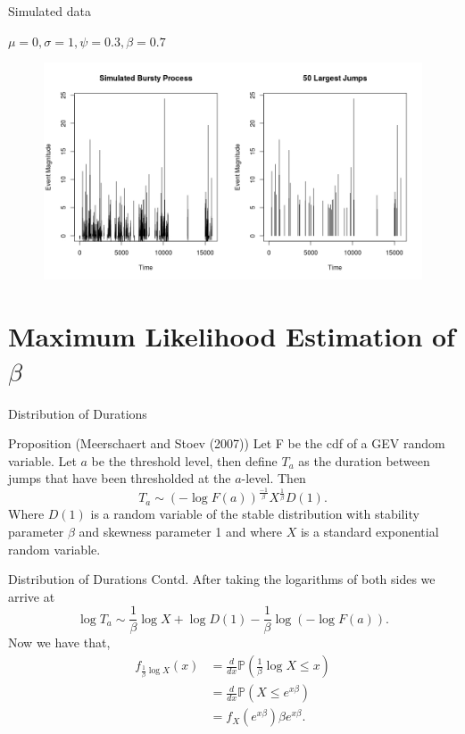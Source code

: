 \documentclass{beamer}
\newcommand{\Prob}{\mathbb{P}}
\begin{document}
\begin{frame}{Simulated data}
    \begin{center}
        $\mu=0, \sigma=1, \psi=0.3,\beta=0.7$
    \end{center}
	\begin{figure}
        \centering
        \vspace{-0.5cm}
        \hspace{-0.8cm}
        \includegraphics[scale=0.45]{SimulatedBursty.jpeg}
    \end{figure}
\end{frame}
\section{Maximum Likelihood Estimation of $\beta$}
\begin{frame}{Distribution of Durations}
    \begin{block}{Proposition (Meerschaert and Stoev (2007))}
        Let F be the cdf of a GEV random variable. Let $a$ be the threshold level, then define $T_a$ as the duration between jumps that have been thresholded at the $a$-level. Then
        \[
            T_a \sim (-\log F(a))^{\frac{-1}{\beta}}X^{\frac{1}{\beta}}D(1).
        \]
        Where $D(1)$ is a random variable of the stable distribution with stability parameter $\beta$ and skewness parameter 1 and where $X$ is a standard exponential random variable.
    \end{block}
\end{frame}

\begin{frame}{Distribution of Durations Contd.}
    After taking the logarithms of both sides we arrive at
    \[
        \log T_a \sim \frac{1}{\beta}\log X + \log D(1) -\frac{1}{\beta}\log(-\log F(a)).
    \]
    Now we have that,
    \begin{align*}
    f_{\frac{1}{\beta}\log X}(x) &= \frac{d}{dx}\Prob\left(\frac{1}{\beta}\log X\leq x\right)\\
                                 &= \frac{d}{dx}\Prob(X\leq e^{x\beta})\\
                                 &= f_X(e^{x\beta})\beta e^{x\beta}.
\end{align*}
\end{frame}
\end{document}
